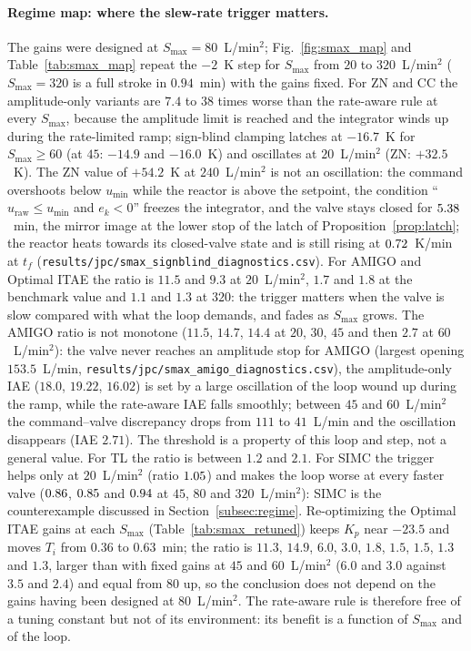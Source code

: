\documentclass[11pt]{article}
\begin{document}


\paragraph{Regime map: where the slew-rate trigger matters.} The gains were designed at $S_{\max} = 80$~L/min$^2$; Fig.~\ref{fig:smax_map} and Table~\ref{tab:smax_map} repeat the $-2$~K step for $S_{\max}$ from $20$ to $320$~L/min$^2$ ($S_{\max} = 320$ is a full stroke in $0.94$~min) with the gains fixed. For ZN and CC the amplitude-only variants are $7.4$ to $38$ times worse than the rate-aware rule at every $S_{\max}$, because the amplitude limit is reached and the integrator winds up during the rate-limited ramp; sign-blind clamping latches at $-16.7$~K for $S_{\max} \ge 60$ (at $45$: $-14.9$ and $-16.0$~K) and oscillates at $20$~L/min$^2$ (ZN: $+32.5$~K). The ZN value of $+54.2$~K at $240$~L/min$^2$ is not an oscillation: the command overshoots below $u_{\min}$ while the reactor is above the setpoint, the condition ``$u_{\text{raw}} \le u_{\min}$ and $e_k < 0$'' freezes the integrator, and the valve stays closed for $5.38$~min, the mirror image at the lower stop of the latch of Proposition~\ref{prop:latch}; the reactor heats towards its closed-valve state and is still rising at $0.72$~K/min at $t_f$ (\texttt{results/jpc/smax\_signblind\_diagnostics.csv}). For AMIGO and Optimal ITAE the ratio is $11.5$ and $9.3$ at $20$~L/min$^2$, $1.7$ and $1.8$ at the benchmark value and $1.1$ and $1.3$ at $320$: the trigger matters when the valve is slow compared with what the loop demands, and fades as $S_{\max}$ grows. The AMIGO ratio is not monotone ($11.5$, $14.7$, $14.4$ at $20$, $30$, $45$ and then $2.7$ at $60$~L/min$^2$): the valve never reaches an amplitude stop for AMIGO (largest opening $153.5$~L/min, \texttt{results/jpc/smax\_amigo\_diagnostics.csv}), the amplitude-only IAE ($18.0$, $19.22$, $16.02$) is set by a large oscillation of the loop wound up during the ramp, while the rate-aware IAE falls smoothly; between $45$ and $60$~L/min$^2$ the command--valve discrepancy drops from $111$ to $41$~L/min and the oscillation disappears (IAE $2.71$). The threshold is a property of this loop and step, not a general value. For TL the ratio is between $1.2$ and $2.1$. For SIMC the trigger helps only at $20$~L/min$^2$ (ratio $1.05$) and makes the loop worse at every faster valve ($0.86$, $0.85$ and $0.94$ at $45$, $80$ and $320$~L/min$^2$): SIMC is the counterexample discussed in Section~\ref{subsec:regime}. Re-optimizing the Optimal ITAE gains at each $S_{\max}$ (Table~\ref{tab:smax_retuned}) keeps $K_p$ near $-23.5$ and moves $T_i$ from $0.36$ to $0.63$~min; the ratio is $11.3$, $14.9$, $6.0$, $3.0$, $1.8$, $1.5$, $1.5$, $1.3$ and $1.3$, larger than with fixed gains at $45$ and $60$~L/min$^2$ ($6.0$ and $3.0$ against $3.5$ and $2.4$) and equal from $80$ up, so the conclusion does not depend on the gains having been designed at $80$~L/min$^2$. The rate-aware rule is therefore free of a tuning constant but not of its environment: its benefit is a function of $S_{\max}$ and of the loop.
\end{document}
